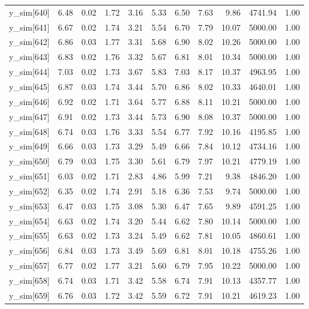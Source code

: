 \begin{table}[ht]
\begin{tabular}{rrrrrrrrrrr}
  y\_sim[640] & 6.48 & 0.02 & 1.72 & 3.16 & 5.33 & 6.50 & 7.63 & 9.86 & 4741.94 & 1.00 \\ 
  y\_sim[641] & 6.67 & 0.02 & 1.74 & 3.21 & 5.54 & 6.70 & 7.79 & 10.07 & 5000.00 & 1.00 \\ 
  y\_sim[642] & 6.86 & 0.03 & 1.77 & 3.31 & 5.68 & 6.90 & 8.02 & 10.26 & 5000.00 & 1.00 \\ 
  y\_sim[643] & 6.83 & 0.02 & 1.76 & 3.32 & 5.67 & 6.81 & 8.01 & 10.34 & 5000.00 & 1.00 \\ 
  y\_sim[644] & 7.03 & 0.02 & 1.73 & 3.67 & 5.83 & 7.03 & 8.17 & 10.37 & 4963.95 & 1.00 \\ 
  y\_sim[645] & 6.87 & 0.03 & 1.74 & 3.44 & 5.70 & 6.86 & 8.02 & 10.33 & 4640.01 & 1.00 \\ 
  y\_sim[646] & 6.92 & 0.02 & 1.71 & 3.64 & 5.77 & 6.88 & 8.11 & 10.21 & 5000.00 & 1.00 \\ 
  y\_sim[647] & 6.91 & 0.02 & 1.73 & 3.44 & 5.73 & 6.90 & 8.08 & 10.37 & 5000.00 & 1.00 \\ 
  y\_sim[648] & 6.74 & 0.03 & 1.76 & 3.33 & 5.54 & 6.77 & 7.92 & 10.16 & 4195.85 & 1.00 \\ 
  y\_sim[649] & 6.66 & 0.03 & 1.73 & 3.29 & 5.49 & 6.66 & 7.84 & 10.12 & 4734.16 & 1.00 \\ 
  y\_sim[650] & 6.79 & 0.03 & 1.75 & 3.30 & 5.61 & 6.79 & 7.97 & 10.21 & 4779.19 & 1.00 \\ 
  y\_sim[651] & 6.03 & 0.02 & 1.71 & 2.83 & 4.86 & 5.99 & 7.21 & 9.38 & 4846.20 & 1.00 \\ 
  y\_sim[652] & 6.35 & 0.02 & 1.74 & 2.91 & 5.18 & 6.36 & 7.53 & 9.74 & 5000.00 & 1.00 \\ 
  y\_sim[653] & 6.47 & 0.03 & 1.75 & 3.08 & 5.30 & 6.47 & 7.65 & 9.89 & 4591.25 & 1.00 \\ 
  y\_sim[654] & 6.63 & 0.02 & 1.74 & 3.20 & 5.44 & 6.62 & 7.80 & 10.14 & 5000.00 & 1.00 \\ 
  y\_sim[655] & 6.63 & 0.02 & 1.73 & 3.24 & 5.49 & 6.62 & 7.81 & 10.05 & 4860.61 & 1.00 \\ 
  y\_sim[656] & 6.84 & 0.03 & 1.73 & 3.49 & 5.69 & 6.81 & 8.01 & 10.18 & 4755.26 & 1.00 \\ 
  y\_sim[657] & 6.77 & 0.02 & 1.77 & 3.21 & 5.60 & 6.79 & 7.95 & 10.22 & 5000.00 & 1.00 \\ 
  y\_sim[658] & 6.74 & 0.03 & 1.71 & 3.42 & 5.58 & 6.74 & 7.91 & 10.13 & 4357.77 & 1.00 \\ 
  y\_sim[659] & 6.76 & 0.03 & 1.72 & 3.42 & 5.59 & 6.72 & 7.91 & 10.21 & 4619.23 & 1.00 \\ 

\end{tabular}
\end{table}
